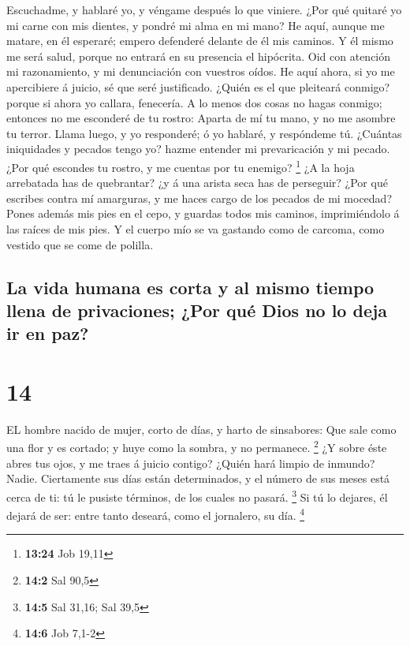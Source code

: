  Escuchadme, y hablaré yo, y véngame después lo que
viniere.  ¿Por qué quitaré yo mi carne con mis dientes, y
pondré mi alma en mi mano?  He aquí, aunque me matare, en
él esperaré; empero defenderé delante de él mis caminos. 
Y él mismo me será salud, porque no entrará en su presencia el
hipócrita.  Oid con atención mi razonamiento, y mi
denunciación con vuestros oídos.  He aquí ahora, si yo me
apercibiere á juicio, sé que seré justificado.  ¿Quién es
el que pleiteará conmigo? porque si ahora yo callara, fenecería.
 A lo menos dos cosas no hagas conmigo; entonces no me
esconderé de tu rostro:  Aparta de mí tu mano, y no me
asombre tu terror.  Llama luego, y yo responderé; ó yo
hablaré, y respóndeme tú.  ¿Cuántas iniquidades y pecados
tengo yo? hazme entender mi prevaricación y mi pecado. 
¿Por qué escondes tu rostro, y me cuentas por tu enemigo? \footnote{\textbf{13:24}
  Job 19,11}  ¿A la hoja arrebatada has de quebrantar? ¿y
á una arista seca has de perseguir?  ¿Por qué escribes
contra mí amarguras, y me haces cargo de los pecados de mi mocedad?
 Pones además mis pies en el cepo, y guardas todos mis
caminos, imprimiéndolo á las raíces de mis pies.  Y el
cuerpo mío se va gastando como de carcoma, como vestido que se come de
polilla.

\hypertarget{la-vida-humana-es-corta-y-al-mismo-tiempo-llena-de-privaciones-por-quuxe9-dios-no-lo-deja-ir-en-paz}{%
\subsection{La vida humana es corta y al mismo tiempo llena de
privaciones; ¿Por qué Dios no lo deja ir en
paz?}\label{la-vida-humana-es-corta-y-al-mismo-tiempo-llena-de-privaciones-por-quuxe9-dios-no-lo-deja-ir-en-paz}}

\hypertarget{section-13}{%
\section{14}\label{section-13}}

 EL hombre nacido de mujer, corto de días, y harto de
sinsabores:  Que sale como una flor y es cortado; y huye
como la sombra, y no permanece. \footnote{\textbf{14:2} Sal 90,5}
 ¿Y sobre éste abres tus ojos, y me traes á juicio
contigo?  ¿Quién hará limpio de inmundo? Nadie.
 Ciertamente sus días están determinados, y el número de
sus meses está cerca de ti: tú le pusiste términos, de los cuales no
pasará. \footnote{\textbf{14:5} Sal 31,16; Sal 39,5}  Si
tú lo dejares, él dejará de ser: entre tanto deseará, como el jornalero,
su día. \footnote{\textbf{14:6} Job 7,1-2}

